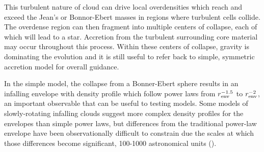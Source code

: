 This turbulent nature of cloud can drive local overdensities which reach and exceed the Jean's or Bonnor-Ebert masses in regions where turbulent cells collide. The overdense region can then fragment into multiple centers of collapse, each of which will lead to a star. Accretion from the turbulent surrounding core material may occur throughout this process. Within these centers of collapse, gravity is dominating the evolution and it is still useful to refer back to simple, symmetric accretion model for overall guidance.

In the simple model, the collapse from a Bonner-Ebert sphere results in an infalling envelope with density profile which follow power laws from $r_\textrm{env}^{-1.5}$ to $r_\textrm{env}^{-2}$, an important observable that can be useful to testing models. Some models of slowly-rotating infalling clouds suggest more complex density profiles for the envelopes \citep[e.g.][]{Ulrich:1976ho,Terebey:1984hi} than simple power laws, but differences from the traditional power-law  envelope have been observationally difficult to constrain due the scales at which those differences become significant, 100-\num{1000}  astronomical units (\si{\au}).





